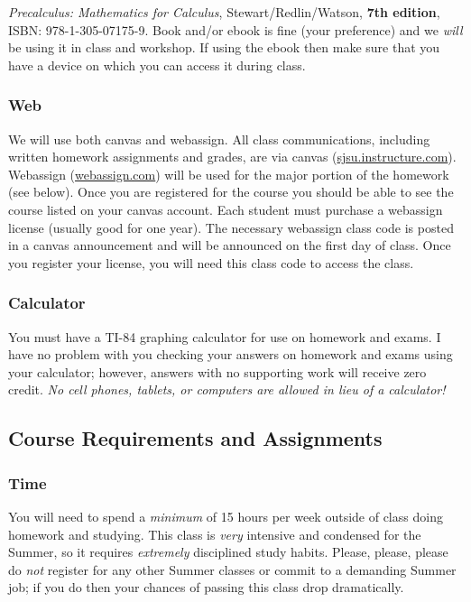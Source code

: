 \documentclass[letterpaper,12pt,fleqn]{article}
\begin{document}
\emph{Precalculus: Mathematics for Calculus}, Stewart/Redlin/Watson, \textbf{7th edition}, ISBN: 978-1-305-07175-9. Book and/or
ebook is fine (your preference) and we \emph{will} be using it in class and workshop.  If using the ebook then make sure that
you have a device on which you can access it during class.

\subsubsection*{Web}

We will use both canvas and webassign. All class communications, including written homework assignments and grades, are
via canvas (\url{sjsu.instructure.com}).  Webassign (\url{webassign.com}) will be used for the major portion of the
homework (see below).  Once you are registered for the course you should be able to see the course listed on your
canvas account.  Each student must purchase a webassign license (usually good for one year). The necessary webassign
class code is posted in a canvas announcement and will be announced on the first day of class. Once you register your
license, you will need this class code to access the class.

\subsubsection*{Calculator}

You must have a TI-84 graphing calculator for use on homework and exams.  I have no problem with you checking your
answers on homework and exams using your calculator; however, answers with no supporting work will receive zero
credit. \emph{No cell phones, tablets, or computers are allowed in lieu of a calculator!}

\subsection*{Course Requirements and Assignments}

\subsubsection*{Time}

You will need to spend a \emph{minimum} of 15 hours per week outside of class doing homework and studying.  This class
is \emph{very} intensive and condensed for the Summer, so it requires \emph{extremely} disciplined study habits.
Please, please, please do \emph{not} register for any other Summer classes or commit to a demanding Summer job; if you
do then your chances of passing this class drop dramatically.
\end{document}
